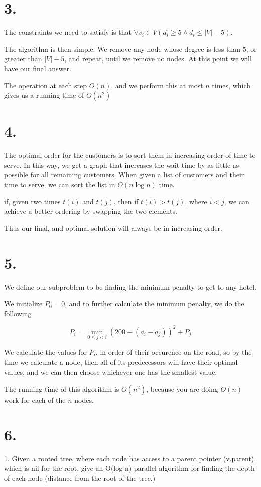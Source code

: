 \documentclass[11pt]{article}
\begin{document}
\section*{3.}
The constraints we need to satisfy is that $\forall v_i \in V (d_i \ge 5 \land
d_i \le |V| - 5)$.

The algorithm is then simple. We remove any node whose degree is less than 5, or
greater than $|V| - 5$, and repeat, until we remove no nodes. At this point we
will have our final answer. 

The operation at each step $O(n)$, and we perform this at most $n$ times, which
gives us a running time of $O(n^2)$
\newpage
\section*{4.}

The optimal order for the customers is to sort them in increasing order of time
to serve. In this way, we get a graph that increases the wait time by as little
as possible for all remaining customers. When given a list of customers and
their time to serve, we can sort the list in $O(n\log n)$ time. 

if, given two times $t(i)$ and $t(j)$, then if $t(i) > t(j)$, where $i < j$, we 
can achieve a better ordering by swapping the two elements.

Thus our final, and optimal solution will always be in increasing order.
\newpage
\section*{5.}
We define our subproblem to be finding the minimum penalty to get to any hotel. 

We initialize $P_0 = 0$, and to further calculate the minimum penalty, we do
the following

\begin{equation*}
P_i = \min_{0\le j<i} (200 - (a_i - a_j))^2 + P_j
\end{equation*}

We calculate the values for $P_i$, in order of their occurence on the road, so
by the time we calculate a node, then all of its predecessors will have their
optimal values, and we can then choose whichever one has the smallest value.

The running time of this algorithm is $O(n^2)$, because you are doing $O(n)$
work for each of the $n$ nodes.
\newpage
\section*{6.}
1. Given a rooted tree, where each node has access to a parent pointer
(v.parent), which is nil for the
root, give an O(log n) parallel algorithm for finding the depth of each node
(distance from the root of
the tree.)
\end{document}
